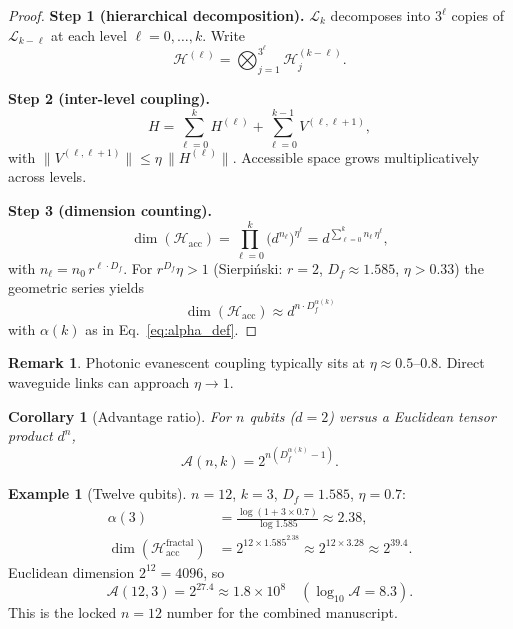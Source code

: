 \documentclass[aps,prx,twocolumn,superscriptaddress,floatfix]{revtex4-2}
\newcommand{\Hilbert}{\mathcal{H}}
\newcommand{\Df}{D_f}
\theoremstyle{plain}
\newtheorem{corollary}[theorem]{Corollary}
\theoremstyle{definition}
\newtheorem{example}[theorem]{Example}
\newtheorem{remark}[theorem]{Remark}
\begin{document}
\begin{proof}
\textbf{Step 1 (hierarchical decomposition).}
$\mathcal{L}_k$ decomposes into $3^\ell$ copies of $\mathcal{L}_{k-\ell}$ at each level $\ell = 0,\ldots,k$. Write
\begin{equation}
\Hilbert^{(\ell)} = \bigotimes_{j=1}^{3^\ell} \Hilbert_j^{(k-\ell)}.
\end{equation}

\textbf{Step 2 (inter-level coupling).}
\begin{equation}
H = \sum_{\ell=0}^{k} H^{(\ell)} + \sum_{\ell=0}^{k-1} V^{(\ell,\ell+1)},
\end{equation}
with $\|V^{(\ell,\ell+1)}\| \leq \eta\,\|H^{(\ell)}\|$. Accessible space grows multiplicatively across levels.

\textbf{Step 3 (dimension counting).}
\begin{equation}
\dim(\Hilbert_{\mathrm{acc}}) = \prod_{\ell=0}^{k} \bigl(d^{n_\ell}\bigr)^{\eta^\ell}
= d^{\sum_{\ell=0}^{k} n_\ell\,\eta^\ell},
\end{equation}
with $n_\ell = n_0\, r^{\ell\cdot\Df}$. For $r^{\Df}\eta > 1$ (Sierpi\'{n}ski: $r=2$, $\Df\approx 1.585$, $\eta > 0.33$) the geometric series yields
\begin{equation}
\dim(\Hilbert_{\mathrm{acc}}) \approx d^{n\cdot\Df^{\alpha(k)}}
\end{equation}
with $\alpha(k)$ as in Eq.~\eqref{eq:alpha_def}.
\end{proof}

\begin{remark}
Photonic evanescent coupling typically sits at $\eta \approx 0.5$--$0.8$. Direct waveguide links can approach $\eta \to 1$.
\end{remark}

\begin{corollary}[Advantage ratio]
\label{cor:advantage}
For $n$ qubits ($d=2$) versus a Euclidean tensor product $d^n$,
\begin{equation}
\mathcal{A}(n,k) = 2^{n(\Df^{\alpha(k)}-1)}.
\label{eq:advantage}
\end{equation}
\end{corollary}

\begin{example}[Twelve qubits]
\label{ex:12qubit}
$n=12$, $k=3$, $\Df=1.585$, $\eta=0.7$:
\begin{align}
\alpha(3) &= \frac{\log(1+3\times 0.7)}{\log 1.585} \approx 2.38, \\
\dim(\Hilbert_{\mathrm{acc}}^{\mathrm{fractal}}) &= 2^{12\times 1.585^{2.38}}
\approx 2^{12\times 3.28} \approx 2^{39.4}.
\end{align}
Euclidean dimension $2^{12}=4096$, so
\begin{equation}
\mathcal{A}(12,3) = 2^{27.4} \approx 1.8\times 10^{8} \quad (\log_{10}\mathcal{A} = 8.3).
\end{equation}
This is the locked $n=12$ number for the combined manuscript.
\end{example}
\end{document}
